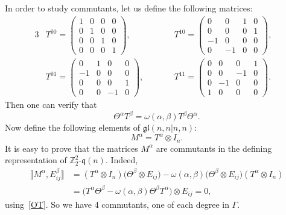 \documentclass[pdftex]{sigma}
\numberwithin{equation}{section}
\theoremstyle{definition}
\def\Z2{\mathbb{Z}_2^2}
\def\gl{\mathfrak{gl}}
\def\qq{$\Z2$-$\q(n)$}
\def\q{\mathfrak{q}}
\begin{document}
In order to study commutants, let us define the following matrices:
\begin{alignat*}{3}
	&
	T^{00}= \left(\begin{matrix}
		1 & 0 & 0 & 0
		\\
		0 & 1 & 0 & 0
		\\
		0 & 0 & 1 & 0
		\\
		0 & 0 & 0 & 1
	\end{matrix}\right), \qquad&&
	T^{10}=\left(\begin{matrix}
		0 & 0 & 1 & 0
		\\
		0 & 0 & 0 & 1
		\\
		-1 & 0 & 0 & 0
		\\
		0 & -1 & 0 & 0
	\end{matrix}\right), & \nonumber\\
	&
	T^{01}=\left(\begin{matrix}
		0 & 1 & 0 & 0
		\\
		- 1 & 0 & 0 & 0
		\\
		0 & 0 & 0 & 1
		\\
		0 & 0 & -1 & 0
	\end{matrix}\right),\qquad&&
	T^{11}=\left(\begin{matrix}
		0 & 0 & 0 & 1
		\\
		0 & 0 & -1 & 0
		\\
		0 & -1 & 0 & 0
		\\
		1 & 0 & 0 & 0
	\end{matrix}\right).&
\end{alignat*}
Then one can verify that
\begin{equation}
	\Theta^\alpha T^\beta = \omega(\alpha,\beta) T^\beta \Theta^\alpha.
	\label{OT}
\end{equation}
Now define the following elements of $\gl(n,n|n,n)$:
\begin{equation*}
	M^\alpha = T^\alpha\otimes I_n.
\end{equation*}
It is easy to prove that the matrices $M^\alpha$ are commutants in the defining representation of \qq.
Indeed,
\begin{align*}
	\bigl\llbracket M^\alpha, E^\beta_{ij}\bigr\rrbracket & = (T^\alpha\otimes I_n)\bigl(\Theta^\beta\otimes E_{ij}\bigr)
	- \omega(\alpha,\beta) \bigl(\Theta^\beta\otimes E_{ij}\bigr)(T^\alpha\otimes I_n) \nonumber\\
	&= \bigl(T^\alpha\Theta^\beta - \omega(\alpha,\beta) \Theta^\beta T^\alpha\bigr) \otimes E_{ij} =0,
\end{align*}
using~\eqref{OT}.
So we have 4 commutants, one of each degree in $\Gamma$.
\end{document}
